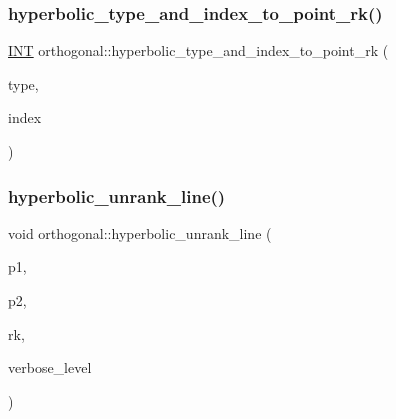 \subsubsection{\texorpdfstring{hyperbolic\+\_\+type\+\_\+and\+\_\+index\+\_\+to\+\_\+point\+\_\+rk()}{hyperbolic\_type\_and\_index\_to\_point\_rk()}}
{\footnotesize\ttfamily \mbox{\hyperlink{galois_8h_a09fddde158a3a20bd2dcadb609de11dc}{I\+NT}} orthogonal\+::hyperbolic\+\_\+type\+\_\+and\+\_\+index\+\_\+to\+\_\+point\+\_\+rk (\begin{DoxyParamCaption}\item[{\mbox{\hyperlink{galois_8h_a09fddde158a3a20bd2dcadb609de11dc}{I\+NT}}}]{type,  }\item[{\mbox{\hyperlink{galois_8h_a09fddde158a3a20bd2dcadb609de11dc}{I\+NT}}}]{index }\end{DoxyParamCaption})}

\mbox{\label{classorthogonal_a94952194cdcc478feb676e97e2e272f2}} 
\subsubsection{\texorpdfstring{hyperbolic\+\_\+unrank\+\_\+line()}{hyperbolic\_unrank\_line()}}
{\footnotesize\ttfamily void orthogonal\+::hyperbolic\+\_\+unrank\+\_\+line (\begin{DoxyParamCaption}\item[{\mbox{\hyperlink{galois_8h_a09fddde158a3a20bd2dcadb609de11dc}{I\+NT}} \&}]{p1,  }\item[{\mbox{\hyperlink{galois_8h_a09fddde158a3a20bd2dcadb609de11dc}{I\+NT}} \&}]{p2,  }\item[{\mbox{\hyperlink{galois_8h_a09fddde158a3a20bd2dcadb609de11dc}{I\+NT}}}]{rk,  }\item[{\mbox{\hyperlink{galois_8h_a09fddde158a3a20bd2dcadb609de11dc}{I\+NT}}}]{verbose\+\_\+level }\end{DoxyParamCaption})}

\mbox{\label{classorthogonal_a8bd53ba30f34ac50889503f0f3ef6deb}} 
